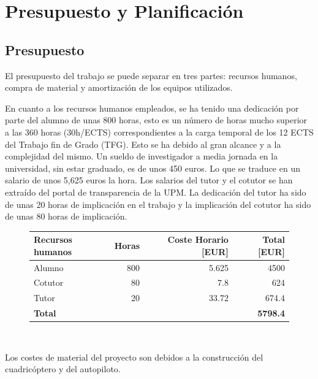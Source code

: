 \appendix
\chapter{Presupuesto y Planificación}
\section{Presupuesto}

El presupuesto del trabajo se puede separar en tres partes: recursos humanos, compra de material y amortización de los equipos utilizados.

En cuanto a los recursos humanos empleados, se ha tenido una dedicación por parte del alumno de unas 800 horas, esto es un número de horas mucho superior a las 360 horas (30h/ECTS) correspondientes a la carga temporal de los 12 ECTS del Trabajo fin de Grado (TFG). Esto se ha debido al gran alcance y a la complejidad del mismo. Un sueldo de investigador a media jornada en la universidad, sin estar graduado, es de unos 450 euros. Lo que se traduce en un salario de unos 5,625 euros la hora. Los salarios del tutor y el cotutor se han extraído del portal de transparencia de la UPM. La dedicación del tutor ha sido de unas 20 horas de implicación en el trabajo y la implicación del cotutor ha sido de unas 80 horas de implicación.  

\begin{figure}[htb!]
		\centering
		\begin{tabular}{|l|r|r|r|}
		\hline
		
		\textbf{Recursos humanos} & Horas &Coste Horario [EUR]&Total [EUR]\\
		\hline
		
		Alumno & 800 & 5.625 &  4500 \\
		Cotutor & 80 & 7.8 & 624\\
		Tutor & 20& 33.72 & 674.4 \\
		\hline
		\textbf{Total} & &  & \textbf{5798.4}\\
		\hline
		\end{tabular}\\
	
\end{figure}

Los costes de material del proyecto son debidos a la construcción del cuadricóptero y del autopiloto.


